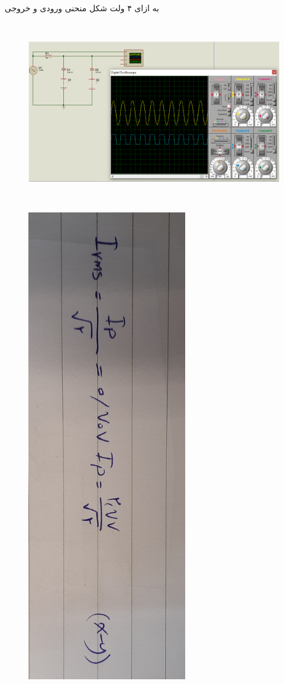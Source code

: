 \documentclass[12pt]{article}
\begin{document}
به ازای ۴ ولت شکل منحنی ورودی و خروجی 
\begin{figure}[H]
	\begin{center}
		\includegraphics[width=\textwidth, height=8cm]{./images/8.3}
	\end{center}
\end{figure}
\begin{figure}[H]
	\begin{center}
		\includegraphics[width=7cm, height=\textwidth, angle=90]{./images/8.i.2}
	\end{center}
\end{figure}
\end{document}
